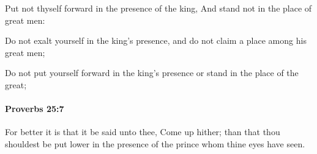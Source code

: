			\begin{versebox}
					\item[BHS] 
					\item[ASV] Put not thyself forward in the presence of the king, And stand not in the place of great men:
					\item[NIV] Do not exalt yourself in the king’s presence, and do not claim a place among his great men;
					\item[NRSV] Do not put yourself forward in the king’s presence or stand in the place of the great;
			\end{versebox}

		\paragraph{Proverbs 25:7} %
			\label{PROVERBS-25-7}

			For better it is that it be said unto thee, Come up hither; than that thou shouldest be put lower in the presence of the prince whom thine eyes have seen.

